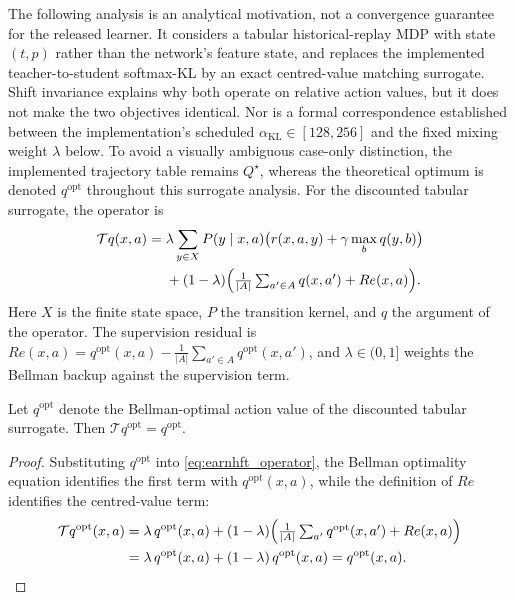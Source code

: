 The following analysis is an analytical motivation, not a convergence guarantee for the released learner. It considers a tabular historical-replay MDP with state $(t,p)$ rather than the network's feature state, and replaces the implemented teacher-to-student softmax-KL by an exact centred-value matching surrogate. Shift invariance explains why both operate on relative action values, but it does not make the two objectives identical. Nor is a formal correspondence established between the implementation's scheduled $\alpha_{\mathrm{KL}}\in[128,256]$ and the fixed mixing weight $\lambda$ below. To avoid a visually ambiguous case-only distinction, the implemented trajectory table remains $Q^\star$, whereas the theoretical optimum is denoted $q^{\mathrm{opt}}$ throughout this surrogate analysis. For the discounted tabular surrogate, the operator is
\begin{equation}
\label{eq:earnhft_operator}
\begin{aligned}
\mathcal{T}q(x,a)={}&\lambda\sum_{y\in X}P(y\mid x,a)
 \bigl(r(x,a,y)+\gamma\max_b q(y,b)\bigr)\\
&+(1-\lambda)\Bigl(\tfrac{1}{|A|}\textstyle\sum_{a'\in A}q(x,a')+Re(x,a)\Bigr).
\end{aligned}
\end{equation}
Here $X$ is the finite state space, $P$ the transition kernel, and $q$ the argument of the operator. The supervision residual is $Re(x,a) = q^{\mathrm{opt}}(x,a) - \tfrac{1}{|A|}\sum_{a'\in A}q^{\mathrm{opt}}(x,a')$, and $\lambda\in(0,1]$ weights the Bellman backup against the supervision term.

\begin{proposition}
\label{prop:earnhft_fixed}
Let $q^{\mathrm{opt}}$ denote the Bellman-optimal action value of the discounted tabular surrogate. Then $\mathcal{T}q^{\mathrm{opt}} = q^{\mathrm{opt}}$.
\end{proposition}
\begin{proof}
Substituting $q^{\mathrm{opt}}$ into \eqref{eq:earnhft_operator}, the Bellman optimality equation identifies the first term with $q^{\mathrm{opt}}(x,a)$, while the definition of $Re$ identifies the centred-value term:
\begin{align*}
\mathcal{T}q^{\mathrm{opt}}(x,a) &= \lambda\, q^{\mathrm{opt}}(x,a)
 +(1-\lambda)\Bigl(\tfrac{1}{|A|}\textstyle\sum_{a'}q^{\mathrm{opt}}(x,a')+Re(x,a)\Bigr) \\
&= \lambda\, q^{\mathrm{opt}}(x,a) + (1-\lambda)\, q^{\mathrm{opt}}(x,a)
 = q^{\mathrm{opt}}(x,a). \qedhere
\end{align*}
\end{proof}

